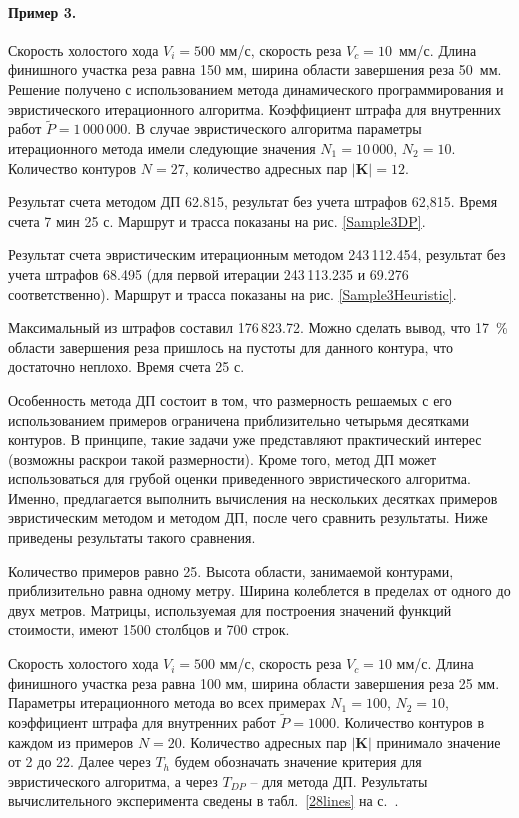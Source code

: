 \paragraph*{Пример 3.}

Скорость холостого хода $V_i=500$ мм/с,
скорость реза $V_c=10$~мм/с.
Длина финишного участка реза равна 150 мм,
ширина области завершения реза 50~мм.
Решение получено с использованием метода динамического программирования
и эвристического итерационного алгоритма.
Коэффициент штрафа для внутренних работ
$\tilde{P}=1\,000\,000$.
В случае эвристического алгоритма параметры итерационного
метода имели следующие значения
$N_1=10\,000$,
$N_2=10$.
Количество контуров $N=27$,
количество адресных пар $|\mathbf{K}|=12$.

Результат счета методом ДП 62.815,
результат без учета штрафов 62,815.
Время счета 7 мин 25 с.
Маршрут и трасса показаны на рис. \ref{Sample3DP}.

Результат счета эвристическим итерационным методом 243\,112.454,
результат без учета штрафов 68.495
(для первой итерации 243\,113.235 и 69.276
соответственно).
Маршрут и трасса показаны на рис. \ref{Sample3Heuristic}.

Максимальный из штрафов составил 176\,823.72.
Можно сделать вывод, что 17~\% области завершения реза пришлось на пустоты для
данного контура, что достаточно неплохо.
Время счета 25 с.

Особенность метода ДП состоит в том,
что размерность решаемых с его использованием примеров
ограничена приблизительно четырьмя десятками контуров.
В принципе, такие задачи уже представляют практический интерес
(возможны раскрои такой размерности).
Кроме того, метод ДП может использоваться для грубой оценки
приведенного эвристического алгоритма.
Именно, предлагается выполнить вычисления на нескольких десятках
примеров эвристическим методом и методом ДП,
после чего сравнить результаты.
Ниже приведены результаты такого сравнения.

Количество примеров равно 25.
Высота области, занимаемой контурами,
приблизительно равна одному метру.
Ширина колеблется в пределах от одного до двух метров.
Матрицы, используемая для построения значений функций стоимости,
имеют 1500 столбцов и 700 строк.

Скорость холостого хода $V_i=500$ мм/с,
скорость реза $V_c=10$ мм/с.
Длина финишного участка реза равна 100 мм,
ширина области завершения реза 25 мм.
Параметры итерационного метода во всех примерах
$N_1=100$, $N_2=10$,
коэффициент штрафа для внутренних работ
$\tilde{P}=1000$.
Количество контуров в каждом из примеров
$N=20$.
Количество адресных пар $|\mathbf{K}|$ принимало значение от 2 до 22.
Далее через
$T_h$ будем обозначать значение критерия для эвристического алгоритма,
а через $T_{DP}$ -- для метода ДП.
Результаты вычислительного эксперимента
сведены в табл.~\ref{28lines}
на с.~\pageref{28lines}.


